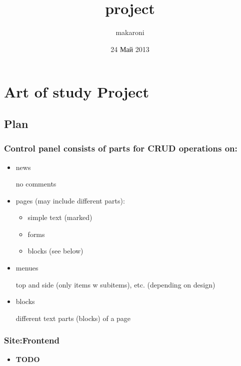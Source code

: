 \documentclass[11pt]{article}
\title{project}
\author{makaroni}
\date{24 Май 2013}
\begin{document}
\maketitle

\setcounter{tocdepth}{3}
\tableofcontents
\vspace*{1cm}
\section{Art of study Project}
\label{sec-1}


\subsection{Plan}
\label{sec-1.1}

\subsubsection{Control panel consists of parts for CRUD operations on:}
\label{sec-1.1.1}

\begin{itemize}

\item news\\
\label{sec-1.1.1.1}

     no comments

\item pages (may include different parts):\\
\label{sec-1.1.1.2}


\begin{itemize}

\item simple text (marked)\\
\label{sec-1.1.1.2.1}


\item forms\\
\label{sec-1.1.1.2.2}


\item blocks (see below)\\
\label{sec-1.1.1.2.3}

\end{itemize} %

\item menues\\
\label{sec-1.1.1.3}

     top and side (only items w subitems), etc. (depending on design)

\item blocks\\
\label{sec-1.1.1.4}

     different text parts (blocks) of a page

\end{itemize} %
\subsubsection{Site:Frontend}
\label{sec-1.1.2}

\begin{itemize}

\item \textbf{TODO}\\
\label{sec-1.1.2.1}

\end{itemize} %
\end{document}
